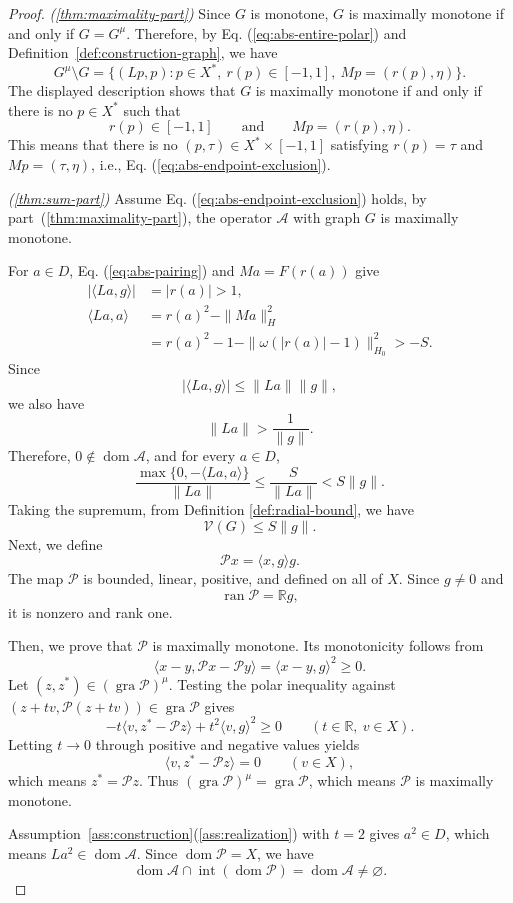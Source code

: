 \documentclass[11pt]{article}
\newcommand{\R}{\mathbb R}
\newcommand{\gra}{\operatorname{gra}}
\newcommand{\dom}{\operatorname{dom}}
\newcommand{\pair}[2]{\langle #1,#2\rangle}
\theoremstyle{definition}
\theoremstyle{remark}
\begin{document}
\begin{proof}
\noindent\textit{\textup{(\ref{thm:maximality-part})}}
Since $G$ is monotone, $G$ is maximally monotone if and only if $G=G^\mu$. Therefore, by Eq. (\ref{eq:abs-entire-polar}) and Definition~\ref{def:construction-graph}, we have 
\[
G^\mu\setminus G
=
\{(Lp,p):p\in X^*,\ r(p)\in[-1,1],\ Mp=(r(p),\eta)\}.
\]
The displayed description shows that $G$ is maximally monotone if and only if there is no $p\in X^*$ such that
\[
r(p)\in[-1,1]
\qquad\text{and}\qquad
Mp=(r(p),\eta).
\]
This means that there is no $(p,\tau)\in X^*\times[-1,1]$ satisfying 
$r(p)=\tau$ and $Mp=(\tau,\eta)$, i.e.,  Eq. (\ref{eq:abs-endpoint-exclusion}).






\noindent\textit{\textup{(\ref{thm:sum-part})}}
Assume Eq. (\ref{eq:abs-endpoint-exclusion}) holds, by
part~\textup{(\ref{thm:maximality-part})}, the operator $\mathcal A$
with graph $G$ is maximally monotone.

For $a\in D$, Eq. (\ref{eq:abs-pairing}) and $Ma=F(r(a))$ give
\[
\begin{aligned}
|\pair{La}{g}|&=|r(a)|>1,\\
\pair{La}{a}
&=r(a)^2-\|Ma\|_H^2\\
&=r(a)^2-1-\|\omega(|r(a)|-1)\|_{H_0}^2>-S.
\end{aligned}
\]
Since
\[
|\pair{La}{g}|\le \|La\|\|g\|,
\]
we also have
\[
\|La\|>\frac{1}{\|g\|}.
\]
Therefore, $0\notin\dom\mathcal A$, and for every $a\in D$,
\[
\frac{\max\{0,-\pair{La}{a}\}}{\|La\|}
\le
\frac{S}{\|La\|}
<
S\|g\|.
\]
Taking the supremum, from Definition \ref{def:radial-bound}, we have
\[
\mathcal V(G)\le S\|g\|.
\]
Next, we define
\[
\mathcal Px=\pair{x}{g}g.
\]
The map $\mathcal P$ is bounded, linear, positive, and defined on all
of $X$. Since $g\ne0$ and
\[
\operatorname{ran}\mathcal P=\R g,
\]
it is nonzero and rank one.

Then, we prove that $\mathcal P$ is maximally monotone. Its monotonicity
follows from
\[
\pair{x-y}{\mathcal Px-\mathcal Py}
=
\pair{x-y}{g}^2\ge0.
\]
Let $(z,z^*)\in(\gra\mathcal P)^\mu$. Testing the polar inequality
against $(z+tv,\mathcal P(z+tv))\in\gra\mathcal P$ gives
\[
-t\pair{v}{z^*-\mathcal Pz}
+t^2\pair{v}{g}^2\ge0
\qquad(t\in\R,\ v\in X).
\]
Letting $t\to0$ through positive and negative values yields
\[
\pair{v}{z^*-\mathcal Pz}=0
\qquad(v\in X),
\]
which means $z^*=\mathcal Pz$. 
Thus $(\gra\mathcal P)^\mu=\gra\mathcal P$, which means $\mathcal P$ is maximally
monotone. 

Assumption~\ref{ass:construction}\textup{(\ref{ass:realization})}
with $t=2$ gives $a^2\in D$, which means 
$La^2\in\dom\mathcal A$. Since $\dom\mathcal P=X$, we have 
\[
\dom\mathcal A\cap\operatorname{int}(\dom\mathcal P)
=
\dom\mathcal A\ne\varnothing.
\]


\end{proof}
\end{document}
